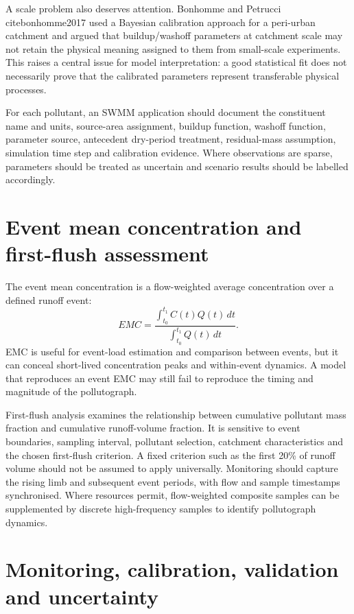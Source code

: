 \documentclass[journal]{IEEEtran}
\begin{document}
A scale problem also deserves attention. Bonhomme and Petrucci \\cite{bonhomme2017} used a Bayesian calibration approach for a peri-urban catchment and argued that buildup/washoff parameters at catchment scale may not retain the physical meaning assigned to them from small-scale experiments. This raises a central issue for model interpretation: a good statistical fit does not necessarily prove that the calibrated parameters represent transferable physical processes.

For each pollutant, an SWMM application should document the constituent name and units, source-area assignment, buildup function, washoff function, parameter source, antecedent dry-period treatment, residual-mass assumption, simulation time step and calibration evidence. Where observations are sparse, parameters should be treated as uncertain and scenario results should be labelled accordingly.

\section{Event mean concentration and first-flush assessment}
The event mean concentration is a flow-weighted average concentration over a defined runoff event:
\begin{equation}
  EMC = \frac{\int_{t_0}^{t_1} C(t)Q(t)\,dt}
  {\int_{t_0}^{t_1} Q(t)\,dt}.
  \label{eq:emc}
\end{equation}
EMC is useful for event-load estimation and comparison between events, but it can conceal short-lived concentration peaks and within-event dynamics. A model that reproduces an event EMC may still fail to reproduce the timing and magnitude of the pollutograph.

First-flush analysis examines the relationship between cumulative pollutant mass fraction and cumulative runoff-volume fraction. It is sensitive to event boundaries, sampling interval, pollutant selection, catchment characteristics and the chosen first-flush criterion. A fixed criterion such as the first 20\% of runoff volume should not be assumed to apply universally. Monitoring should capture the rising limb and subsequent event periods, with flow and sample timestamps synchronised. Where resources permit, flow-weighted composite samples can be supplemented by discrete high-frequency samples to identify pollutograph dynamics.

\section{Monitoring, calibration, validation and uncertainty}
\end{document}
